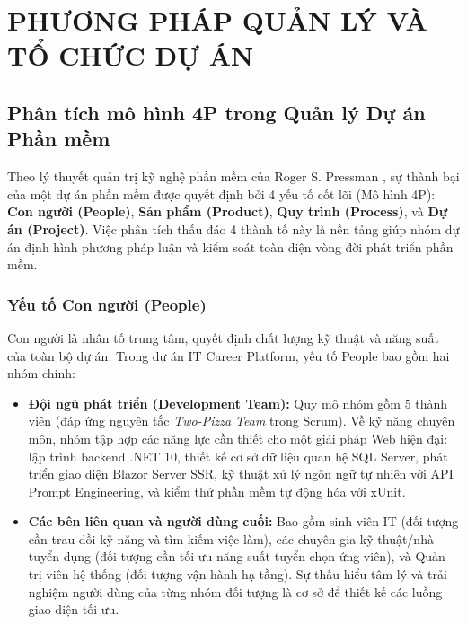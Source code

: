 \chapter{PHƯƠNG PHÁP QUẢN LÝ VÀ TỔ CHỨC DỰ ÁN}
\label{chap:quan-ly-to-chuc}

\section{Phân tích mô hình 4P trong Quản lý Dự án Phần mềm}
\label{sec:mo-hinh-4p}

Theo lý thuyết quản trị kỹ nghệ phần mềm của Roger S. Pressman \cite{pressman2020}, sự thành bại của một dự án phần mềm được quyết định bởi 4 yếu tố cốt lõi (Mô hình 4P): \textbf{Con người (People)}, \textbf{Sản phẩm (Product)}, \textbf{Quy trình (Process)}, và \textbf{Dự án (Project)}. Việc phân tích thấu đáo 4 thành tố này là nền tảng giúp nhóm dự án định hình phương pháp luận và kiểm soát toàn diện vòng đời phát triển phần mềm.

\subsection{Yếu tố Con người (People)}
Con người là nhân tố trung tâm, quyết định chất lượng kỹ thuật và năng suất của toàn bộ dự án. Trong dự án IT Career Platform, yếu tố People bao gồm hai nhóm chính:
\begin{itemize}
    \item \textbf{Đội ngũ phát triển (Development Team):} Quy mô nhóm gồm 5 thành viên (đáp ứng nguyên tắc \textit{Two-Pizza Team} trong Scrum). Về kỹ năng chuyên môn, nhóm tập hợp các năng lực cần thiết cho một giải pháp Web hiện đại: lập trình backend .NET 10, thiết kế cơ sở dữ liệu quan hệ SQL Server, phát triển giao diện Blazor Server SSR, kỹ thuật xử lý ngôn ngữ tự nhiên với API Prompt Engineering, và kiểm thử phần mềm tự động hóa với xUnit.
    \item \textbf{Các bên liên quan và người dùng cuối:} Bao gồm sinh viên IT (đối tượng cần trau dồi kỹ năng và tìm kiếm việc làm), các chuyên gia kỹ thuật/nhà tuyển dụng (đối tượng cần tối ưu năng suất tuyển chọn ứng viên), và Quản trị viên hệ thống (đối tượng vận hành hạ tầng). Sự thấu hiểu tâm lý và trải nghiệm người dùng của từng nhóm đối tượng là cơ sở để thiết kế các luồng giao diện tối ưu.
\end{itemize}

